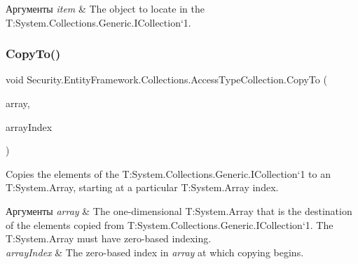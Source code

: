\begin{DoxyParams}{Аргументы}
{\em item} & The object to locate in the T\+:\+System.\+Collections.\+Generic.\+I\+Collection`1.\\
\hline
\end{DoxyParams}
\mbox{\label{class_security_1_1_entity_framework_1_1_collections_1_1_access_type_collection_a4205a769e5ecee02914f87b1fd612097}} 
\subsubsection{\texorpdfstring{Copy\+To()}{CopyTo()}}
{\footnotesize\ttfamily void Security.\+Entity\+Framework.\+Collections.\+Access\+Type\+Collection.\+Copy\+To (\begin{DoxyParamCaption}\item[{\hyperlink{interface_security_1_1_interfaces_1_1_model_1_1_i_access_type}{I\+Access\+Type} \mbox{[}$\,$\mbox{]}}]{array,  }\item[{int}]{array\+Index }\end{DoxyParamCaption})}



Copies the elements of the T\+:\+System.\+Collections.\+Generic.\+I\+Collection`1 to an T\+:\+System.\+Array, starting at a particular T\+:\+System.\+Array index. 


\begin{DoxyParams}{Аргументы}
{\em array} & The one-\/dimensional T\+:\+System.\+Array that is the destination of the elements copied from T\+:\+System.\+Collections.\+Generic.\+I\+Collection`1. The T\+:\+System.\+Array must have zero-\/based indexing.\\
\hline
{\em array\+Index} & The zero-\/based index in {\itshape array}  at which copying begins.\\
\hline
\end{DoxyParams}

